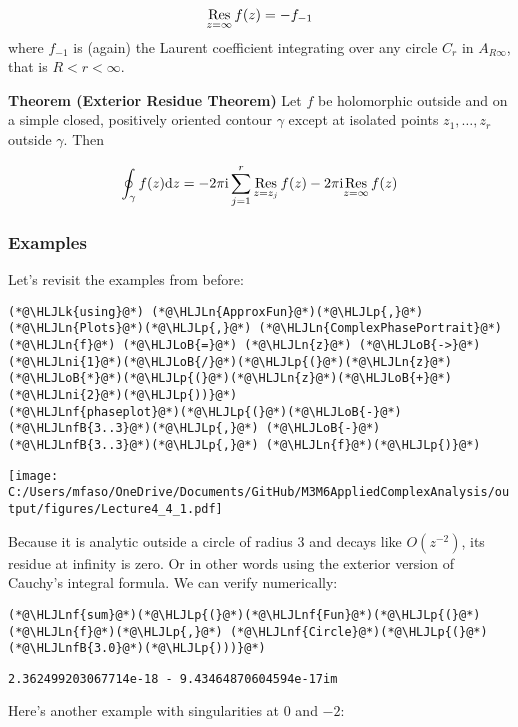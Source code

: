 \documentclass[12pt,a4paper]{article}
\newcommand{\HLJLk}[1]{\textcolor[RGB]{148,91,176}{\textbf{#1}}}
\newcommand{\HLJLn}[1]{#1}
\newcommand{\HLJLnf}[1]{\textcolor[RGB]{66,102,213}{#1}}
\newcommand{\HLJLnfB}[1]{\textcolor[RGB]{59,151,46}{#1}}
\newcommand{\HLJLni}[1]{\textcolor[RGB]{59,151,46}{#1}}
\newcommand{\HLJLoB}[1]{\textcolor[RGB]{102,102,102}{\textbf{#1}}}
\newcommand{\HLJLp}[1]{#1}
\def\D{ {\rm d} }
\def\I{ {\rm i} }
\def\Res_#1{\underset{#1}{\rm Res}\,}
\def\dz{\D z}
\begin{document}
\[
{\underset{z = \infty}{\rm Res}} \, f(z) = -f_{-1}
\]
where $f_{-1}$ is (again) the Laurent coefficient integrating over any circle $C_r$ in $A_{R\infty}$, that is $R < r < \infty$.

\textbf{Theorem (Exterior Residue Theorem)} Let $f$ be holomorphic outside and on a simple closed, positively oriented contour $\gamma$ except at isolated points $z_1, \ldots, z_r$ outside $\gamma$. Then

\[
\oint_\gamma f(z) \dz = -2 \pi \I \sum_{j=1}^r {\underset{z = z_j}{\rm Res}}\, f(z) - 2 \pi \I \Res_{z = \infty} f(z)
\]
\subsubsection{Examples}
Let's revisit the examples from before:


\begin{lstlisting}
(*@\HLJLk{using}@*) (*@\HLJLn{ApproxFun}@*)(*@\HLJLp{,}@*) (*@\HLJLn{Plots}@*)(*@\HLJLp{,}@*) (*@\HLJLn{ComplexPhasePortrait}@*)
(*@\HLJLn{f}@*) (*@\HLJLoB{=}@*) (*@\HLJLn{z}@*) (*@\HLJLoB{->}@*) (*@\HLJLni{1}@*)(*@\HLJLoB{/}@*)(*@\HLJLp{(}@*)(*@\HLJLn{z}@*)(*@\HLJLoB{*}@*)(*@\HLJLp{(}@*)(*@\HLJLn{z}@*)(*@\HLJLoB{+}@*)(*@\HLJLni{2}@*)(*@\HLJLp{))}@*)
(*@\HLJLnf{phaseplot}@*)(*@\HLJLp{(}@*)(*@\HLJLoB{-}@*)(*@\HLJLnfB{3..3}@*)(*@\HLJLp{,}@*) (*@\HLJLoB{-}@*)(*@\HLJLnfB{3..3}@*)(*@\HLJLp{,}@*) (*@\HLJLn{f}@*)(*@\HLJLp{)}@*)
\end{lstlisting}

\texttt{[image: C:/Users/mfaso/OneDrive/Documents/GitHub/M3M6AppliedComplexAnalysis/output/figures/Lecture4\_4\_1.pdf]}

Because it is analytic outside a circle of radius 3 and decays like $O(z^{-2})$, its residue at infinity is zero. Or in other words using the exterior version of Cauchy's integral formula. We can verify numerically:


\begin{lstlisting}
(*@\HLJLnf{sum}@*)(*@\HLJLp{(}@*)(*@\HLJLnf{Fun}@*)(*@\HLJLp{(}@*)(*@\HLJLn{f}@*)(*@\HLJLp{,}@*) (*@\HLJLnf{Circle}@*)(*@\HLJLp{(}@*)(*@\HLJLnfB{3.0}@*)(*@\HLJLp{)))}@*)
\end{lstlisting}

\begin{lstlisting}
2.362499203067714e-18 - 9.43464870604594e-17im
\end{lstlisting}


Here's another example with singularities at $0$ and $-2$:
\end{document}
